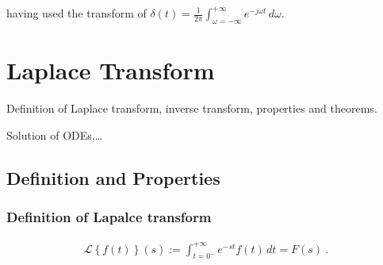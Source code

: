 \documentclass[letterpaper,10pt,english]{jupyterBook}
\begin{document}
\sphinxAtStartPar
having used the transform of {\hyperref[\detokenize{ch/functional-analysis/dirac-delta:functional-analysis-dirac-delta}]{}} \(\delta(t) = \frac{1}{2\pi} \int_{\omega=-\infty}^{+\infty} e^{-j \omega t} \, d\omega\).

\sphinxAtStartPar
{} 

\sphinxstepscope


\chapter{Laplace Transform}
\label{\detokenize{ch/complex/laplace:laplace-transform}}\label{\detokenize{ch/complex/laplace:complex-laplace}}\label{\detokenize{ch/complex/laplace::doc}}
\sphinxAtStartPar
{\hyperref[\detokenize{ch/complex/laplace-def-thm:complex-laplace-def-thm}]{}} Definition of Laplace transform, inverse transform, properties and theorems.

\sphinxAtStartPar
{\hyperref[\detokenize{ch/complex/laplace-applications:complex-laplace-applications}]{}} Solution of ODEs,…

\sphinxstepscope


\section{Definition and Properties}
\label{\detokenize{ch/complex/laplace-def-thm:definition-and-properties}}\label{\detokenize{ch/complex/laplace-def-thm:complex-laplace-def-thm}}\label{\detokenize{ch/complex/laplace-def-thm::doc}}

\subsection{Definition of Lapalce transform}
\label{\detokenize{ch/complex/laplace-def-thm:definition-of-lapalce-transform}}\begin{equation*}
\begin{split}\mathscr{L}\left\{ f(t) \right\}(s) := \int_{t=0^-}^{+\infty} e^{-st} f(t) \, dt = F(s) \ .\end{split}
\end{equation*}
\end{document}
